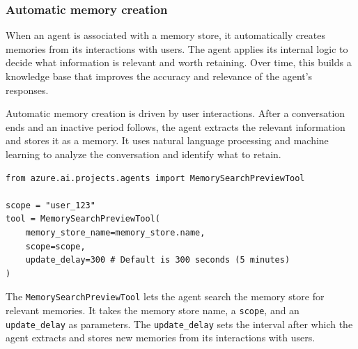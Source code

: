 \documentclass[9pt]{extarticle}%
\begin{document}
\subsubsection{Automatic memory creation}%
When an agent is associated with a memory store, it automatically creates memories from its interactions with users. The agent applies its internal logic to decide what information is relevant and worth retaining. Over time, this builds a knowledge base that improves the accuracy and relevance of the agent's responses.
%
\par\vspace{\baselineskip}%
Automatic memory creation is driven by user interactions. After a conversation ends and an inactive period follows, the agent extracts the relevant information and stores it as a memory. It uses natural language processing and machine learning to analyze the conversation and identify what to retain.
%
\par\vspace{\baselineskip}%
{\small
\begin{verbatim}
from azure.ai.projects.agents import MemorySearchPreviewTool

scope = "user_123" 
tool = MemorySearchPreviewTool(
    memory_store_name=memory_store.name,
    scope=scope,
    update_delay=300 # Default is 300 seconds (5 minutes)
)

\end{verbatim}}%
\vspace{\baselineskip}%
The \texttt{MemorySearchPreviewTool} lets the agent search the memory store for relevant memories. It takes the memory store name, a \texttt{scope}, and an \texttt{update\_delay} as parameters. The \texttt{update\_delay} sets the interval after which the agent extracts and stores new memories from its interactions with users.
%
\par\vspace{\baselineskip}%
\end{document}
